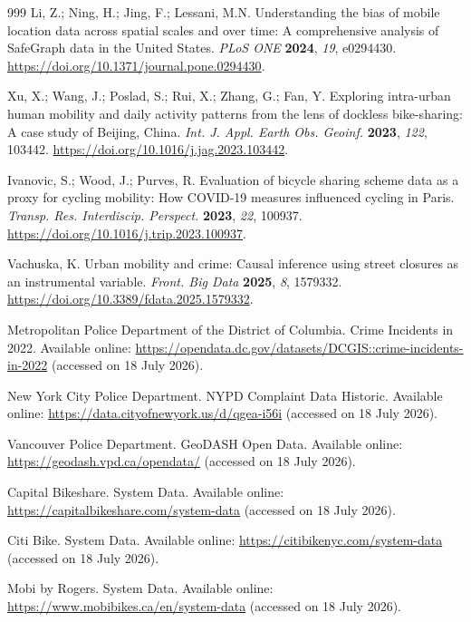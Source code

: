 \begin{thebibliography}{999}
Li, Z.; Ning, H.; Jing, F.; Lessani, M.N. Understanding the bias of mobile location data across spatial scales and over time: A comprehensive analysis of SafeGraph data in the United States. \emph{PLoS ONE} \textbf{2024}, \emph{19}, e0294430. \url{https://doi.org/10.1371/journal.pone.0294430}.

Xu, X.; Wang, J.; Poslad, S.; Rui, X.; Zhang, G.; Fan, Y. Exploring intra-urban human mobility and daily activity patterns from the lens of dockless bike-sharing: A case study of Beijing, China. \emph{Int. J. Appl. Earth Obs. Geoinf.} \textbf{2023}, \emph{122}, 103442. \url{https://doi.org/10.1016/j.jag.2023.103442}.

Ivanovic, S.; Wood, J.; Purves, R. Evaluation of bicycle sharing scheme data as a proxy for cycling mobility: How COVID-19 measures influenced cycling in Paris. \emph{Transp. Res. Interdiscip. Perspect.} \textbf{2023}, \emph{22}, 100937. \url{https://doi.org/10.1016/j.trip.2023.100937}.

Vachuska, K. Urban mobility and crime: Causal inference using street closures as an instrumental variable. \emph{Front. Big Data} \textbf{2025}, \emph{8}, 1579332. \url{https://doi.org/10.3389/fdata.2025.1579332}.

Metropolitan Police Department of the District of Columbia. Crime Incidents in 2022. Available online: \url{https://opendata.dc.gov/datasets/DCGIS::crime-incidents-in-2022} (accessed on 18 July 2026).

New York City Police Department. NYPD Complaint Data Historic. Available online: \url{https://data.cityofnewyork.us/d/qgea-i56i} (accessed on 18 July 2026).

Vancouver Police Department. GeoDASH Open Data. Available online: \url{https://geodash.vpd.ca/opendata/} (accessed on 18 July 2026).

Capital Bikeshare. System Data. Available online: \url{https://capitalbikeshare.com/system-data} (accessed on 18 July 2026).

Citi Bike. System Data. Available online: \url{https://citibikenyc.com/system-data} (accessed on 18 July 2026).

Mobi by Rogers. System Data. Available online: \url{https://www.mobibikes.ca/en/system-data} (accessed on 18 July 2026).


\end{thebibliography}
